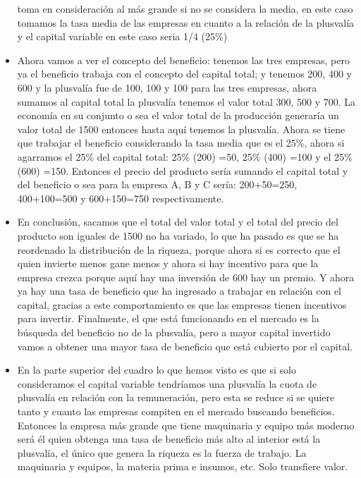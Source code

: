 \documentclass[
  a4paper,
]{article}
\begin{document}
\begin{itemize}
  toma en consideración al más grande si no se considera la media, en
  este caso tomamos la tasa media de las empresas en cuanto a la
  relación de la plusvalía y el capital variable en este caso seria 1/4
  (25\%)
\item
  Ahora vamos a ver el concepto del beneficio: tenemos las tres
  empresas, pero ya el beneficio trabaja con el concepto del capital
  total; y tenemos 200, 400 y 600 y la plusvalía fue de 100, 100 y 100
  para las tres empresas, ahora sumamos al capital total la plusvalía
  tenemos el valor total 300, 500 y 700. La economía en su conjunto o
  sea el valor total de la producción generaría un valor total de 1500
  entonces hasta aquí tenemos la plusvalía. Ahora se tiene que trabajar
  el beneficio considerando la tasa media que es el 25\%, ahora si
  agarramos el 25\% del capital total: 25\% (200) =50, 25\% (400) =100 y
  el 25\% (600) =150. Entonces el precio del producto sería sumando el
  capital total y del beneficio o sea para la empresa A, B y C sería:
  200+50=250, 400+100=500 y 600+150=750 respectivamente.
\item
  En conclusión, sacamos que el total del valor total y el total del
  precio del producto son iguales de 1500 no ha variado, lo que ha
  pasado es que se ha reordenado la distribución de la riqueza, porque
  ahora si es correcto que el quien invierte menos gane menos y ahora si
  hay incentivo para que la empresa crezca porque aquí hay una inversión
  de 600 hay un premio. Y ahora ya hay una tasa de beneficio que ha
  ingresado a trabajar en relación con el capital, gracias a este
  comportamiento es que las empresas tienen incentivos para invertir.
  Finalmente, el que está funcionando en el mercado es la búsqueda del
  beneficio no de la plusvalía, pero a mayor capital invertido vamos a
  obtener una mayor tasa de beneficio que está cubierto por el capital.
\item
  En la parte superior del cuadro lo que hemos visto es que si solo
  consideramos el capital variable tendríamos una plusvalía la cuota de
  plusvalía en relación con la remuneración, pero esta se reduce si se
  quiere tanto y cuanto las empresas compiten en el mercado buscando
  beneficios. Entonces la empresa más grande que tiene maquinaria y
  equipo más moderno será él quien obtenga una tasa de beneficio más
  alto al interior está la plusvalía, el único que genera la riqueza es
  la fuerza de trabajo. La maquinaria y equipos, la materia prima e
  insumos, etc. Solo transfiere valor.
\end{itemize}
\end{document}
